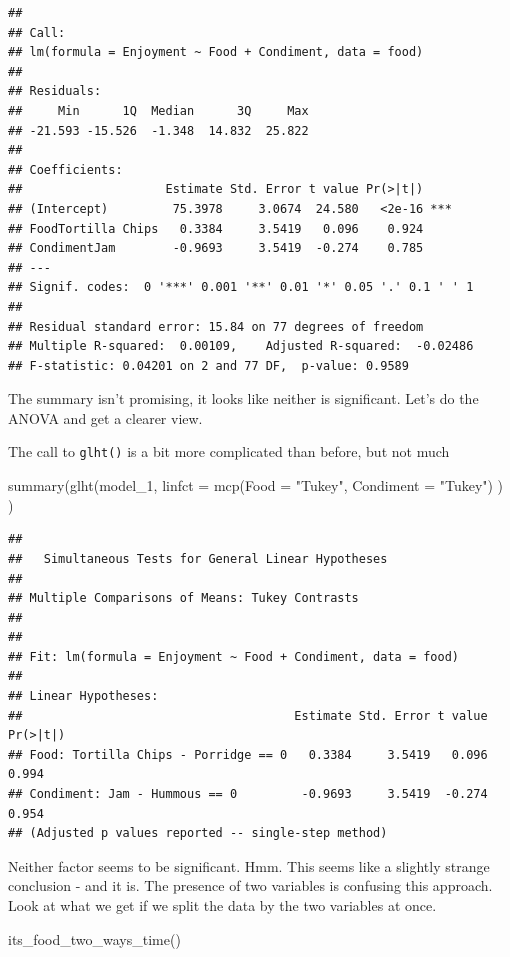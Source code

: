 \documentclass[
]{book}
\newenvironment{Shaded}{\begin{snugshade}}{\end{snugshade}}
\newcommand{\AttributeTok}[1]{\textcolor[rgb]{0.77,0.63,0.00}{#1}}
\newcommand{\FunctionTok}[1]{\textcolor[rgb]{0.00,0.00,0.00}{#1}}
\newcommand{\NormalTok}[1]{#1}
\newcommand{\StringTok}[1]{\textcolor[rgb]{0.31,0.60,0.02}{#1}}
\begin{document}
\begin{verbatim}
## 
## Call:
## lm(formula = Enjoyment ~ Food + Condiment, data = food)
## 
## Residuals:
##     Min      1Q  Median      3Q     Max 
## -21.593 -15.526  -1.348  14.832  25.822 
## 
## Coefficients:
##                    Estimate Std. Error t value Pr(>|t|)    
## (Intercept)         75.3978     3.0674  24.580   <2e-16 ***
## FoodTortilla Chips   0.3384     3.5419   0.096    0.924    
## CondimentJam        -0.9693     3.5419  -0.274    0.785    
## ---
## Signif. codes:  0 '***' 0.001 '**' 0.01 '*' 0.05 '.' 0.1 ' ' 1
## 
## Residual standard error: 15.84 on 77 degrees of freedom
## Multiple R-squared:  0.00109,	Adjusted R-squared:  -0.02486 
## F-statistic: 0.04201 on 2 and 77 DF,  p-value: 0.9589
\end{verbatim}

The summary isn't promising, it looks like neither is significant. Let's do the ANOVA and get a clearer view.

The call to \texttt{glht()} is a bit more complicated than before, but not much

\begin{Shaded}
\begin{Highlighting}[]
\FunctionTok{summary}\NormalTok{(}\FunctionTok{glht}\NormalTok{(model\_1, }\AttributeTok{linfct =} \FunctionTok{mcp}\NormalTok{(}\AttributeTok{Food =} \StringTok{"Tukey"}\NormalTok{, }\AttributeTok{Condiment =} \StringTok{"Tukey"}\NormalTok{) ) )}
\end{Highlighting}
\end{Shaded}

\begin{verbatim}
## 
## 	 Simultaneous Tests for General Linear Hypotheses
## 
## Multiple Comparisons of Means: Tukey Contrasts
## 
## 
## Fit: lm(formula = Enjoyment ~ Food + Condiment, data = food)
## 
## Linear Hypotheses:
##                                      Estimate Std. Error t value Pr(>|t|)
## Food: Tortilla Chips - Porridge == 0   0.3384     3.5419   0.096    0.994
## Condiment: Jam - Hummous == 0         -0.9693     3.5419  -0.274    0.954
## (Adjusted p values reported -- single-step method)
\end{verbatim}

Neither factor seems to be significant. Hmm. This seems like a slightly strange conclusion - and it is. The presence of two variables is confusing this approach. Look at what we get if we split the data by the two variables at once.

\begin{Shaded}
\begin{Highlighting}[]
\FunctionTok{its\_food\_two\_ways\_time}\NormalTok{()}
\end{Highlighting}
\end{Shaded}
\end{document}
